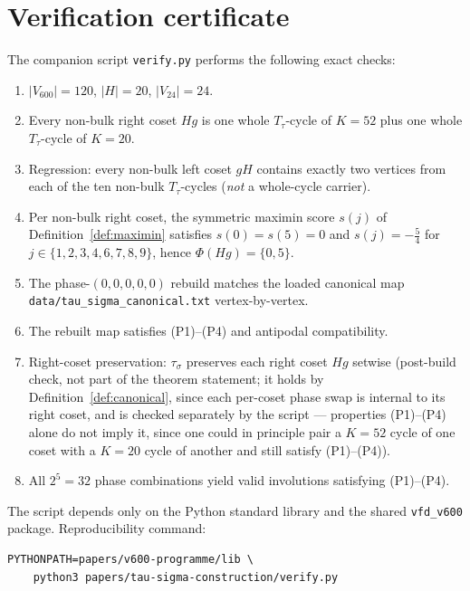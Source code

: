 \documentclass[11pt]{article}
\newcommand{\Vsixhundred}{V_{600}}
\newcommand{\Vtwentyfour}{V_{24}}
\newcommand{\sigmaG}{\sigma}
\newcommand{\tausigma}{\tau_{\!\sigmaG}}
\newcommand{\Ttau}{T_{\tau}}
\begin{document}
\appendix

\section{Verification certificate}\label{app:verify}

The companion script \texttt{verify.py} performs the following exact
checks:
\begin{enumerate}[leftmargin=2em]
\item $|\Vsixhundred| = 120$, $|H| = 20$, $|\Vtwentyfour| = 24$.
\item Every non-bulk right coset $Hg$ is one whole $\Ttau$-cycle of
$K=52$ plus one whole $\Ttau$-cycle of $K=20$.
\item Regression: every non-bulk left coset $gH$ contains exactly
two vertices from each of the ten non-bulk $\Ttau$-cycles
(\emph{not} a whole-cycle carrier).
\item Per non-bulk right coset, the symmetric maximin score $s(j)$ of
Definition~\ref{def:maximin} satisfies $s(0) = s(5) = 0$ and
$s(j) = -\tfrac{5}{4}$ for $j \in \{1,2,3,4,6,7,8,9\}$, hence
$\Phi(Hg) = \{0, 5\}$.
\item The phase-$(0,0,0,0,0)$ rebuild matches the loaded canonical
map \texttt{data/tau\_sigma\_canonical.txt} vertex-by-vertex.
\item The rebuilt map satisfies (P1)–(P4) and antipodal compatibility.
\item Right-coset preservation: $\tausigma$ preserves each right coset
$Hg$ setwise (post-build check, not part of the theorem statement; it
holds by Definition~\ref{def:canonical}, since each per-coset phase
swap is internal to its right coset, and is checked separately by the
script — properties (P1)--(P4) alone do not imply it, since one could
in principle pair a $K=52$ cycle of one coset with a $K=20$ cycle of
another and still satisfy (P1)--(P4)).
\item All $2^5 = 32$ phase combinations yield valid involutions
satisfying (P1)–(P4).
\end{enumerate}
The script depends only on the Python standard library and the shared
\texttt{vfd\_v600} package. Reproducibility command:
\begin{verbatim}
PYTHONPATH=papers/v600-programme/lib \
    python3 papers/tau-sigma-construction/verify.py
\end{verbatim}



\end{document}
